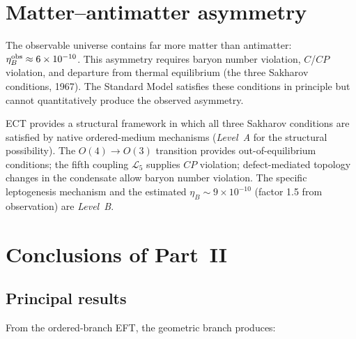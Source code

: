 \documentclass[11pt,a4paper]{article}
\begin{document}
\section{Matter--antimatter asymmetry}

The observable universe contains far more matter than antimatter: $\eta_B^{\rm obs} \approx 6 \times 10^{-10}$. This asymmetry requires baryon number violation, $C$/$CP$ violation, and departure from thermal equilibrium (the three Sakharov conditions, 1967). The Standard Model satisfies these conditions in principle but cannot quantitatively produce the observed asymmetry.

ECT provides a structural framework in which all three Sakharov conditions are satisfied by native ordered-medium mechanisms (\emph{Level~A} for the structural possibility). The $O(4) \to O(3)$ transition provides out-of-equilibrium conditions; the fifth coupling $\mathcal{L}_5$ supplies $CP$ violation; defect-mediated topology changes in the condensate allow baryon number violation. The specific leptogenesis mechanism and the estimated $\eta_B \sim 9 \times 10^{-10}$ (factor 1.5 from observation) are \emph{Level~B}.





\section{Conclusions of Part~II}

\subsection{Principal results}

From the ordered-branch EFT, the geometric branch produces:
\end{document}
